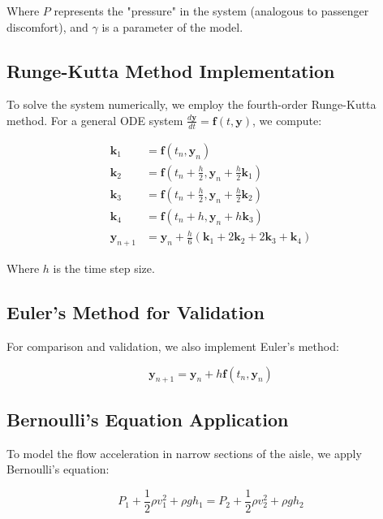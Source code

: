 \documentclass[a4paper,12pt]{article}
\begin{document}
Where $P$ represents the "pressure" in the system (analogous to passenger discomfort), and $\gamma$ is a parameter of the model.

\subsection{Runge-Kutta Method Implementation}

To solve the system numerically, we employ the fourth-order Runge-Kutta method. For a general ODE system $\frac{d\mathbf{y}}{dt} = \mathbf{f}(t, \mathbf{y})$, we compute:

\begin{align}
\mathbf{k}_1 &= \mathbf{f}(t_n, \mathbf{y}_n) \\
\mathbf{k}_2 &= \mathbf{f}(t_n + \frac{h}{2}, \mathbf{y}_n + \frac{h}{2}\mathbf{k}_1) \\
\mathbf{k}_3 &= \mathbf{f}(t_n + \frac{h}{2}, \mathbf{y}_n + \frac{h}{2}\mathbf{k}_2) \\
\mathbf{k}_4 &= \mathbf{f}(t_n + h, \mathbf{y}_n + h\mathbf{k}_3) \\
\mathbf{y}_{n+1} &= \mathbf{y}_n + \frac{h}{6}(\mathbf{k}_1 + 2\mathbf{k}_2 + 2\mathbf{k}_3 + \mathbf{k}_4)
\end{align}

Where $h$ is the time step size.

\subsection{Euler's Method for Validation}

For comparison and validation, we also implement Euler's method:

\begin{equation}
\mathbf{y}_{n+1} = \mathbf{y}_n + h\mathbf{f}(t_n, \mathbf{y}_n)
\end{equation}

\subsection{Bernoulli's Equation Application}

To model the flow acceleration in narrow sections of the aisle, we apply Bernoulli's equation:

\begin{equation}
P_1 + \frac{1}{2}\rho v_1^2 + \rho g h_1 = P_2 + \frac{1}{2}\rho v_2^2 + \rho g h_2
\end{equation}
\end{document}
